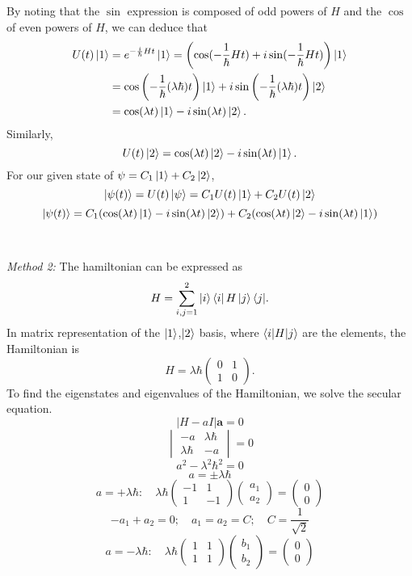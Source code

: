 \documentclass[11pt,letterpaper]{article}
\newcommand{\vect}[1]{\mathbf{#1}}
\begin{document}
\begin{enumerate}
\begin{enumerate}
By noting that the $\sin$ expression is composed of odd powers of $H$ and the $\cos$ of even powers of $H$, we can deduce that
\begin{align*}U(t)\ket 1 &= e^{-\frac{i}{\hbar}Ht}\ket 1 = \left(\cos(-\frac{1}{\hbar}Ht)+i\sin(-\frac{1}{\hbar}Ht)\right)\ket 1\\
&=\cos\left(-\frac{1}{\hbar}(\lambda\hbar)t\right)\ket 1 +i\sin\left(-\frac{1}{\hbar}(\lambda\hbar)t\right)\ket 2\\
&=\cos(\lambda t)\ket 1-i\sin(\lambda t)\ket 2.
 \end{align*}
 Similarly, 
 $$U(t)\ket 2 =\cos(\lambda t)\ket 2-i\sin(\lambda t)\ket 1.$$
 For our given state of $\psi = C_1\ket 1+C_2\ket 2$, 
$$\ket{\psi(t)} = U(t)\ket\psi=C_1U(t)\ket1+C_2U(t)\ket2$$
 $$\ket{\psi(t)}=C_1(\cos(\lambda t)\ket 1-i\sin(\lambda t)\ket 2)+C_2(\cos(\lambda t)\ket 2-i\sin(\lambda t)\ket 1)
$$
\\ \\ \emph{Method 2:}
  The hamiltonian can be expressed as
  $$H = \sum_{i,j = 1}^{2}{\ket i\bra iH\ket j\bra j}.$$
  In matrix representation of the $\ket1$,$\ket2$ basis, where $\braket{i|H|j}$ are the elements, the Hamiltonian is
  $$H=\lambda\hbar\begin{pmatrix}0&1\\1&0
  \end{pmatrix}.$$
  To find the eigenstates and eigenvalues of the Hamiltonian, we solve the secular equation.
  $$|H-aI|\vect a=0$$ 
  $$\begin{vmatrix}-a&\lambda\hbar\\\lambda\hbar&-a
  \end{vmatrix}=0$$
  $$a^2-\lambda^2\hbar^2 = 0$$
  $$a=\pm\lambda\hbar$$
  $$a=+\lambda\hbar:\quad\lambda\hbar\begin{pmatrix}-1&1\\1&-1\end{pmatrix}\begin{pmatrix}a_1\\a_2\end{pmatrix} = \begin{pmatrix}0\\0\end{pmatrix}$$
  $$-a_1+a_2 = 0;\quad a_1=a_2=C;\quad C=\frac{1}{\sqrt 2}$$
  $$a=-\lambda\hbar:\quad\lambda\hbar\begin{pmatrix}1&1\\1&1\end{pmatrix}\begin{pmatrix}b_1\\b_2\end{pmatrix} = \begin{pmatrix}0\\0\end{pmatrix}$$

\end{enumerate}
\end{enumerate}
\end{document}
